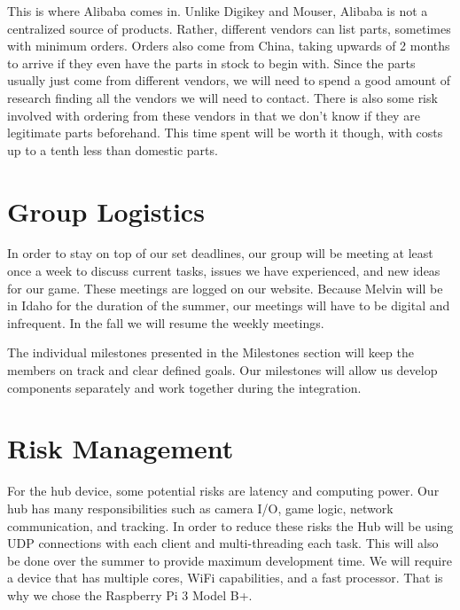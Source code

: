 \documentclass[11pt]{ieeeconf}
\begin{document}
This is where Alibaba comes in. Unlike Digikey and Mouser, Alibaba is not a centralized source of products. Rather, different vendors can list parts, sometimes with minimum orders. Orders also come from China, taking upwards of 2 months to arrive if they even have the parts in stock to begin with. Since the parts usually just come from different vendors, we will need to spend a good amount of research finding all the vendors we will need to contact. There is also some risk involved with ordering from these vendors in that we don’t know if they are legitimate parts beforehand. This time spent will be worth it though, with costs up to a tenth less than domestic parts.


\section{Group Logistics}
In order to stay on top of our set deadlines, our group will be meeting at least once a week to discuss current tasks, issues we have experienced, and new ideas for our game. These meetings are logged on our website. Because Melvin will be in Idaho for the duration of the summer, our meetings will have to be digital and infrequent. In the fall we will resume the weekly meetings.

The individual milestones presented in the Milestones section will keep the members on track and clear defined goals. Our milestones will allow us develop components separately and work together during the integration. 

\section{Risk Management}

For the hub device, some potential risks are latency and computing power. Our hub has many responsibilities such as camera I/O, game logic,  network communication, and tracking. In order to reduce these risks the Hub will be using UDP connections with each client and multi-threading each task. This will also be done over the summer to provide maximum development time. We will require a device that has multiple cores, WiFi capabilities, and a fast processor. That is why we chose the Raspberry Pi 3 Model B+.
\end{document}

